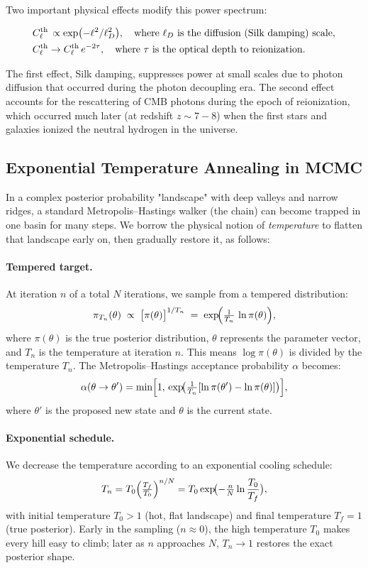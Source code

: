 \documentclass[11pt]{article}
\theoremstyle{definition}
\begin{document}
Two important physical effects modify this power spectrum:

\begin{align}
  &C_\ell^{\rm th}\,\propto\exp\bigl(-\ell^2/\ell_D^2\bigr),
  \quad
  \text{where }\ell_D\text{ is the diffusion (Silk damping) scale},\\
  &C_\ell^{\rm th}\to C_\ell^{\rm th}\,e^{-2\tau},
  \quad
  \text{where }\tau\text{ is the optical depth to reionization}.
\end{align}

The first effect, Silk damping, suppresses power at small scales due to photon diffusion that occurred during the photon decoupling era. The second effect accounts for the rescattering of CMB photons during the epoch of reionization, which occurred much later (at redshift $z \sim 7-8$) when the first stars and galaxies ionized the neutral hydrogen in the universe.

\subsection{Exponential Temperature Annealing in MCMC}

In a complex posterior probability "landscape" with deep valleys and narrow ridges, a standard Metropolis–Hastings walker (the chain) can become trapped in one basin for many steps. We borrow the physical notion of \emph{temperature} to flatten that landscape early on, then gradually restore it, as follows:

\paragraph{Tempered target.}  At iteration \(n\) of a total \(N\) iterations, we sample from a tempered distribution:
\[
\pi_{T_n}(\theta)\;\propto\;\bigl[\pi(\theta)\bigr]^{1/T_n}
\;=\;\exp\!\Bigl(\tfrac{1}{T_n}\,\ln\pi(\theta)\Bigr),
\]
where $\pi(\theta)$ is the true posterior distribution, $\theta$ represents the parameter vector, and $T_n$ is the temperature at iteration $n$. This means \(\log\pi(\theta)\) is divided by the temperature $T_n$. The Metropolis–Hastings acceptance probability $\alpha$ becomes:
\[
\alpha(\theta\to\theta')
= \min\Bigl[1,\,
\exp\!\bigl(\tfrac{1}{T_n}[\ln\pi(\theta')-\ln\pi(\theta)]\bigr)\Bigr],
\]
where $\theta'$ is the proposed new state and $\theta$ is the current state.

\paragraph{Exponential schedule.} We decrease the temperature according to an exponential cooling schedule:
\[
T_n = T_0\Bigl(\tfrac{T_f}{T_0}\Bigr)^{n/N}
     = T_0\exp\!\bigl(-\tfrac{n}{N}\ln\frac{T_0}{T_f}\bigr),
\]
with initial temperature \(T_0>1\) (hot, flat landscape) and final temperature \(T_f=1\) (true posterior). Early in the sampling (\(n\approx0\)), the high temperature $T_0$ makes every hill easy to climb; later as $n$ approaches $N$, \(T_n\to1\) restores the exact posterior shape.
\end{document}
